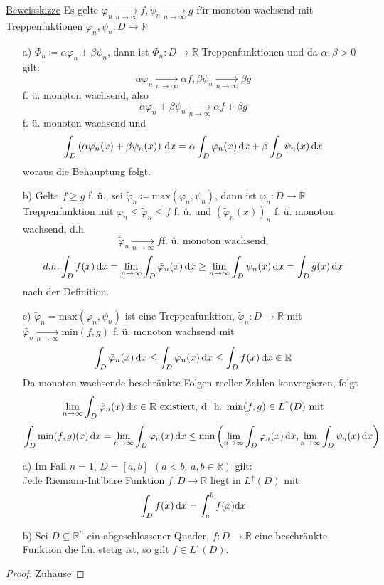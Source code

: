 \underline{Beweisskizze} Es gelte $\varphi_n \xrightarrow[n \to \infty]{} f, \psi_n \xrightarrow[n \to \infty]{}g$ für monoton wachsend mit Treppenfuktionen $\varphi_n, \psi_n \colon D \to \mathbb{R}$
\begin{itemize}
	\item[a)] $\Phi_n \coloneqq \alpha \varphi_n + \beta \psi_n$, dann ist $\Phi_n \colon D \to \mathbb{R}$ Treppenfunktionen und da $\alpha, \beta >0$ gilt: \[\alpha\varphi_n \xrightarrow[n \to \infty]{}\alpha f, \beta\psi_n \xrightarrow[n \to \infty]{}\beta g\] f. ü. monoton wachsend, also \[\alpha \varphi_n + \beta \psi_n \xrightarrow[n \to \infty]{}\alpha f + \beta g\] f. ü. monoton wachsend und \[\int_D \left(\alpha\varphi_n(x) + \beta\psi_n(x)\right) \,\text{d}x = \alpha \int_D \varphi_n(x)  \,\text{d}x + \beta\int_D \psi_n(x) \,\text{d}x\] woraus die Behauptung folgt.
	\item[b)] Gelte $f \geq g$ f. ü., sei $\tilde{\varphi}_n \coloneqq \text{max}(\varphi_n, \psi_n)$, dann ist $\varphi_n \colon D \to  \mathbb{R}$ Treppenfunktion mit $\varphi_n \leq \tilde{\varphi}_n \leq f$ f. ü. und $(\tilde{\varphi}_n(x))_n$ f. ü. monoton wachsend, d.h. \[\tilde{\varphi}_n \xrightarrow[n \to \infty]{}f \text{f. ü. monoton wachsend,}\]
	      \[d.h. \int_D f(x) \,\text{d}x = \lim_{n \to \infty} \int_D \tilde{\varphi}_n(x) \,\text{d}x \geq \lim_{n \to \infty} \int_D \psi_n(x) \,\text{d}x = \int_D g(x) \,\text{d}x\]
	      nach der Definition.
	\item[c)] $\tilde{\varphi}_n = \text{max}(\varphi_n,\psi_n)$ ist eine Treppenfunktion, $\tilde{\varphi}_n \colon D \to \mathbb{R}$ mit $\tilde{\varphi_n} \xrightarrow[n \to \infty]{} \text{min}(f,g)$ f. ü. monoton wachsend mit \[\int_D \tilde{\varphi}_n(x) \,\text{d}x \leq \int_D \varphi_n(x) \,\text{d}x \leq \int_D f(x) \,\text{d}x \in \mathbb{R}\] Da monoton wachsende beschränkte Folgen reeller Zahlen konvergieren, folgt \[\lim_{n \to \infty} \int_D \tilde{\varphi}_n(x) \,\text{d}x \in \mathbb{R} \text{ existiert, d. h. min}(f,g) \in L^\uparrow(D) \text{ mit}\] \[\int_D \text{min}(f,g)(x) \,\text{d}x = \lim_{n \to \infty} \int_D \tilde{\varphi}_n(x) \,\text{d}x \leq \text{min}\left(\lim_{n \to \infty} \int_D \varphi_n(x) \,\text{d}x, \lim_{n \to \infty} \int_D \psi_n(x) \,\text{d}x\right)\]
\end{itemize}

\begin{satz}\leavevmode
	\begin{itemize}
		\item[a)] Im Fall $n=1$, $D=[a, b]\ \ (a<b,\, a,b\in\mathbb{R})$ gilt:\\
		Jede Riemann-Int'bare Funktion $f\colon D\to\mathbb{R}$ liegt in $L^\uparrow(D)$ mit \[\int_D f(x) \,\text{d}x=\int_a^bf(x) \text{d}x\]
		\item[b)] Sei $D\subseteq \mathbb{R}^n$ ein abgeschlossener Quader, $f\colon D\to\mathbb{R}$ eine beschränkte Funktion die f.ü. stetig ist, so gilt $f\in L^\uparrow(D)$.
	\end{itemize}
\end{satz}
\begin{proof}
	Zuhause
\end{proof}

